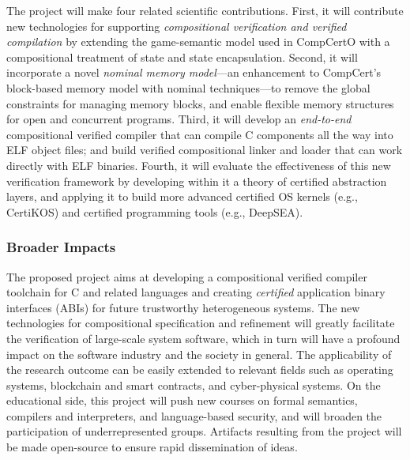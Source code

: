 The project will make four related scientific
contributions.
First, it will contribute new technologies for supporting
{\em compositional verification and verified compilation}
by extending the game-semantic model used in CompCertO
with a compositional treatment of state and state encapsulation.
Second, it
will incorporate a novel {\em nominal memory model}---an enhancement to
CompCert's block-based memory model with nominal techniques---to
remove the global constraints for managing memory blocks, and enable
flexible memory structures for open and concurrent programs. Third, it
will develop an {\em end-to-end} compositional verified compiler
that can compile C components all the way into ELF object files; and
build verified compositional linker and loader that can work directly
with ELF binaries.
Fourth, it will evaluate the
effectiveness of this new verification framework
by developing within it a theory of certified abstraction layers, and
applying it to build
more advanced certified OS kernels (e.g., CertiKOS) and certified
programming tools (e.g., DeepSEA).

\subsubsection*{Broader Impacts}

The proposed project aims at developing a compositional verified
compiler toolchain for C and related languages and creating {\em
certified} application binary interfaces (ABIs) for future trustworthy
heterogeneous systems. The new technologies for compositional
specification and refinement will greatly facilitate the verification
of large-scale system software, which in turn will have a profound impact
on the software industry and the society in general. The applicability
of the research outcome can be easily extended to relevant fields such
as operating systems, blockchain and smart contracts, and
cyber-physical systems.  On the educational side, this project will
push new courses on formal semantics, compilers and interpreters, and
language-based security, and will broaden the participation of
underrepresented groups.  Artifacts resulting from the project will be
made open-source to ensure rapid dissemination of ideas.

